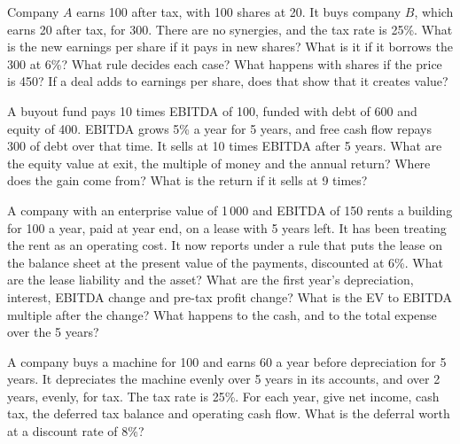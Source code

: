 \begin{question}\label{iq:iv2:valuation-and-financial-statements:17}
Company $A$ earns 100 after tax, with 100 shares at 20. It buys company $B$, which earns 20 after tax, for 300. There are no synergies, and the tax rate is 25\%. What is the new earnings per share if it pays in new shares? What is it if it borrows the 300 at 6\%? What rule decides each case? What happens with shares if the price is 450? If a deal adds to earnings per share, does that show that it creates value?
\end{question}

\begin{question}\label{iq:iv2:valuation-and-financial-statements:18}
A buyout fund pays 10 times EBITDA of 100, funded with debt of 600 and equity of 400. EBITDA grows 5\% a year for 5 years, and free cash flow repays 300 of debt over that time. It sells at 10 times EBITDA after 5 years. What are the equity value at exit, the multiple of money and the annual return? Where does the gain come from? What is the return if it sells at 9 times?
\end{question}

\begin{question}\label{iq:iv2:valuation-and-financial-statements:19}
A company with an enterprise value of 1\,000 and EBITDA of 150 rents a building for 100 a year, paid at year end, on a lease with 5 years left. It has been treating the rent as an operating cost. It now reports under a rule that puts the lease on the balance sheet at the present value of the payments, discounted at 6\%. What are the lease liability and the asset? What are the first year's depreciation, interest, EBITDA change and pre-tax profit change? What is the EV to EBITDA multiple after the change? What happens to the cash, and to the total expense over the 5 years?
\end{question}

\begin{question}\label{iq:iv2:valuation-and-financial-statements:20}
A company buys a machine for 100 and earns 60 a year before depreciation for 5 years. It depreciates the machine evenly over 5 years in its accounts, and over 2 years, evenly, for tax. The tax rate is 25\%. For each year, give net income, cash tax, the deferred tax balance and operating cash flow. What is the deferral worth at a discount rate of 8\%?
\end{question}


